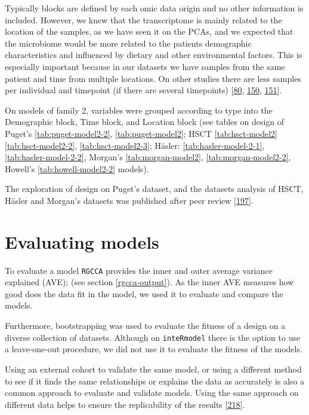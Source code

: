 \documentclass[
  12pt,
  a4paper,
  twoside,
  openright]{book}
\begin{document}
Typically blocks are defined by each omic data origin and no other information is included.
However, we knew that the transcriptome is mainly related to the location of the samples, as we have seen it on the PCAs, and we expected that the microbiome would be more related to the patients demographic characteristics and influenced by dietary and other environmental factors.
This is especially important because in our datasets we have samples from the same patient and time from multiple locations.
On other studies there are less samples per individual and timepoint (if there are several timepoints) {[}\protect\hyperlink{ref-hasler_uncoupling_2016}{80}, \protect\hyperlink{ref-morgan2015}{150}, \protect\hyperlink{ref-howell2018}{151}{]}.

On models of family 2, variables were grouped according to type into the Demographic block, Time block, and Location block (see tables on design of Puget's \ref{tab:puget-model2-2}, \ref{tab:puget-model2}; HSCT \ref{tab:hsct-model2} \ref{tab:hsct-model2-2}, \ref{tab:hsct-model2-3}; Häsler: \ref{tab:hasler-model-2-1}, \ref{tab:hasler-model-2-2}, Morgan's \ref{tab:morgan-model2}, \ref{tab:morgan-model2-2}, Howell's \ref{tab:howell-model2-2} models).

The exploration of design on Puget's dataset, and the datasets analysis of HSCT, Häsler and Morgan's datasets was published after peer review {[}\protect\hyperlink{ref-revilla2021}{197}{]}.

\hypertarget{evaluating-models}{%
\section{Evaluating models}\label{evaluating-models}}

To evaluate a model \texttt{RGCCA} provides the inner and outer average variance explained (AVE); (see section \ref{rgcca-output}).
As the inner AVE measures how good does the data fit in the model, we used it to evaluate and compare the models.

Furthermore, bootstrapping was used to evaluate the fitness of a design on a diverse collection of datasets.
Although on \texttt{inteRmodel} there is the option to use a leave-one-out procedure, we did not use it to evaluate the fitness of the models.

Using an external cohort to validate the same model, or using a different method to see if it finds the same relationships or explains the data as accurately is also a common approach to evaluate and validate models.
Using the same approach on different data helps to ensure the replicability of the results {[}\protect\hyperlink{ref-community2021}{218}{]}.
\end{document}
